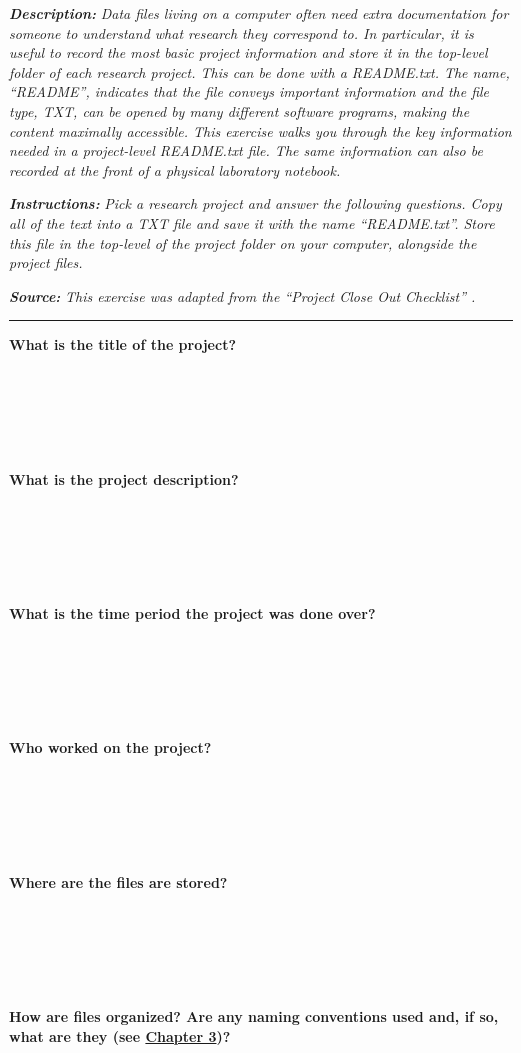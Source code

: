 \documentclass[
]{book}
\begin{document}
\textbf{\emph{Description:}} \emph{Data files living on a computer often need extra documentation for someone to understand what research they correspond to. In particular, it is useful to record the most basic project information and store it in the top-level folder of each research project. This can be done with a README.txt. The name, ``README'', indicates that the file conveys important information and the file type, TXT, can be opened by many different software programs, making the content maximally accessible. This exercise walks you through the key information needed in a project-level README.txt file. The same information can also be recorded at the front of a physical laboratory notebook.}

\textbf{\emph{Instructions:}} \emph{Pick a research project and answer the following questions. Copy all of the text into a TXT file and save it with the name ``README.txt''. Store this file in the top-level of the project folder on your computer, alongside the project files.}

\textbf{\emph{Source:}} \emph{This exercise was adapted from the ``Project Close Out Checklist'' \citep{briney_project_2020}.}

\begin{center}\rule{0.5\linewidth}{0.5pt}\end{center}

\textbf{What is the title of the project?}

~

~

~

\textbf{What is the project description?}

~

~

~

\textbf{What is the time period the project was done over?}

~

~

~

\textbf{Who worked on the project?}

~

~

~

\textbf{Where are the files are stored?}

~

~

~

\textbf{How are files organized? Are any naming conventions used and, if so, what are they (see \protect\hyperlink{file-organization-and-naming}{Chapter 3})?}
\end{document}
